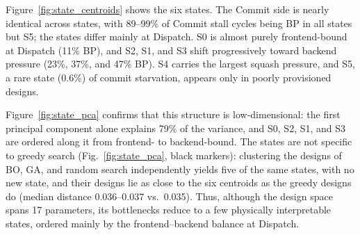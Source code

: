Figure~\ref{fig:state_centroids} shows the six states.
%
The Commit side is nearly identical across states, with 89--99\% of Commit stall cycles being BP in all states but S5; the states differ mainly at Dispatch.
%
S0 is almost purely frontend-bound at Dispatch (11\% BP), and S2, S1, and S3 shift progressively toward backend pressure (23\%, 37\%, and 47\% BP).
%
S4 carries the largest squash pressure, and S5, a rare state (0.6\%) of commit starvation, appears only in poorly provisioned designs.

Figure~\ref{fig:state_pca} confirms that this structure is low-dimensional: the first principal component alone explains 79\% of the variance, and S0, S2, S1, and S3 are ordered along it from frontend- to backend-bound.
%
The states are not specific to greedy search (Fig.~\ref{fig:state_pca}, black markers): clustering the designs of BO, GA, and random search independently yields five of the same states, with no new state, and their designs lie as close to the six centroids as the greedy designs do (median distance 0.036--0.037 vs.\ 0.035).
%
Thus, although the design space spans 17 parameters, its bottlenecks reduce to a few physically interpretable states, ordered mainly by the frontend--backend balance at Dispatch.
